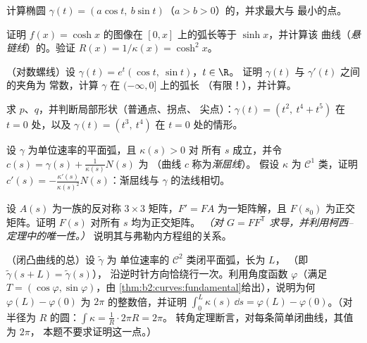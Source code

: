 \begin{exercise}[$\star$]\label{exo:b2:curves:2}
计算椭圆 $\gamma(t) = (a\cos t,\ b\sin
t)$（$a > b > 0$）的，并求最大与
最小的点。
\end{exercise}

\begin{exercise}[$\star$]\label{exo:b2:curves:3}
证明 $f(x) = \cosh x$ 的图像在
$[0, x]$ 上的弧长等于 $\sinh x$，并计算该
曲线（\emph{悬链线}）的。验证 $R(x) = 1/\kappa(x) =
\cosh^2 x$。
\end{exercise}

\begin{exercise}[$\star\star$]\label{exo:b2:curves:4}
（对数螺线）设 $\gamma(t) = e^{t}(\cos t,\ \sin t)$，$t
\in \R$。
证明 $\gamma(t)$ 与 $\gamma'(t)$ 之间的夹角为
常数，计算 $\gamma$ 在 $(-\infty, 0]$ 上的弧长
（有限！），并计算。
\end{exercise}

\begin{exercise}[$\star\star$]\label{exo:b2:curves:5}
求 $p$、$q$，并判断局部形状（普通点、拐点、
尖点）：$\gamma(t) = (t^2,\ t^4 + t^5)$ 在 $t = 0$ 处，以及
$\gamma(t) = (t^3,\ t^4)$ 在 $t = 0$ 处的情形。
\end{exercise}

\begin{exercise}[$\star\star$]\label{exo:b2:curves:6}
设 $\gamma$ 为单位速率的平面弧，且 $\kappa(s) > 0$ 对
所有 $s$ 成立，并令 $c(s) = \gamma(s) + \frac{1}{\kappa(s)}N(s)$ 为
（曲线 $c$ 称为\emph{渐屈线}）。
假设 $\kappa$ 为 $\mathcal{C}^1$ 类，证明 $c'(s) =
-\frac{\kappa'(s)}{\kappa(s)^2}N(s)$：渐屈线与
$\gamma$ 的法线相切。
\end{exercise}

\begin{exercise}[$\star\star\star$]\label{exo:b2:curves:7}
设 $A(s)$ 为一族的反对称 $3 \times 3$
矩阵，$F' = F A$ 为一矩阵解，且 $F(s_0)$
为正交矩阵。证明 $F(s)$ 对所有 $s$ 均为正交矩阵。
\emph{（对 $G = F F^{\mathsf T}$ 求导，并利用柯西–
定理中的唯一性。）} 说明其与弗勒内方程组的关系。
\end{exercise}

\begin{exercise}[$\star\star\star$]\label{exo:b2:curves:8}
（闭凸曲线的总）设 $\tilde\gamma$ 为
单位速率的 $\mathcal{C}^2$ 类闭平面弧，长为 $L$，
（即 $\tilde\gamma(s + L) = \tilde\gamma(s)$），
沿逆时针方向恰绕行一次。利用角度函数 $\varphi$（满足 $T =
(\cos\varphi, \sin\varphi)$，由
\cref{thm:b2:curves:fundamental}给出），说明为何 $\varphi(L) -
\varphi(0)$ 为 $2\pi$ 的整数倍，并证明
$\int_0^L \kappa(s)\,\dd s = \varphi(L) - \varphi(0)$。（对半径为
$R$ 的圆：$\int \kappa = \frac1R \cdot 2\pi R = 2\pi$。
转角定理断言，对每条简单闭曲线，其值为 $2\pi$，
本题不要求证明这一点。）
\end{exercise}

